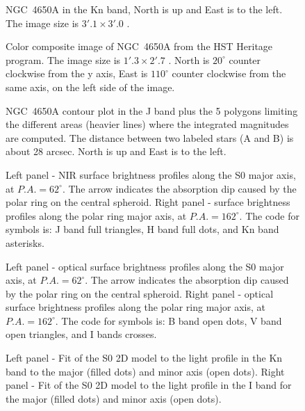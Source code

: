 \documentclass[preprint]{aastex}
\begin{document}
\newpage

\begin{figure}
\caption{\label{fig1} NGC~4650A in the Kn band, North is up and East is to
the left. The image size is $3'.1 \times 3'.0$ .}
\end{figure}
 
\begin{figure}
\caption{\label{fig2} Color composite image of NGC~4650A from the
HST Heritage program. The image size is $1'.3 \times 2'.7$ . North is
$20^\circ$ counter clockwise from the y axis, East is $110^\circ$
counter clockwise from the same axis, on the left side of the image.}
\end{figure}
 
\begin{figure}
\caption{\label{fig3} NGC~4650A contour plot in the J band plus
the 5 polygons limiting the different areas (heavier lines) where the integrated
magnitudes are computed. The distance between two labeled stars (A and B) is about
28 arcsec. North is up and East is to the left.}
\end{figure}
                                                                    
\begin{figure}
\caption{\label{fig4} Left panel - NIR surface brightness profiles along the
S0 major axis,
at $P.A.=62^\circ$. The arrow indicates the absorption dip caused by
the polar ring on the central spheroid.
Right panel -  surface brightness profiles along the polar ring major axis, at
$P.A.=162^\circ$. The code for symbols is: J band full triangles, H band full
dots, and Kn band asterisks. }
\end{figure}
 
\begin{figure}
\caption{\label{fig5}
Left panel - optical surface brightness
 profiles along the S0 major axis, at $P.A.=62^\circ$.
The arrow indicates the absorption dip caused by the polar ring on the central
spheroid.
Right panel - optical surface brightness profiles along the polar ring major axis, at
$P.A.=162^\circ$.
The code for symbols is: B band open dots, V band open triangles, and I
bands crosses.}
\end{figure}
 
                                                                  
\begin{figure}
\caption{\label{fig6}
Left panel - Fit of the S0 2D model to the light profile in
the Kn band to the major (filled dots) and minor axis (open dots).
Right panel - Fit of the S0 2D model to the light profile in the
I band for the major (filled dots) and minor axis (open dots).}
\end{figure}
 
\end{document}
